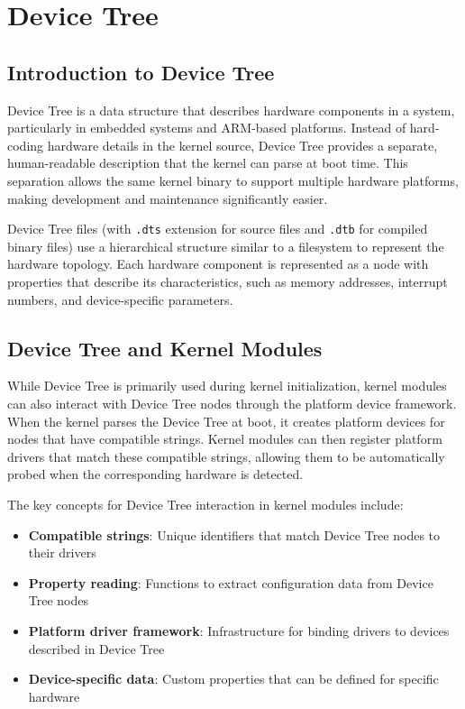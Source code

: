 \documentclass[10pt, oneside]{book}
\begin{document}
\section{Device Tree}
\label{sec:device_tree}
\subsection{Introduction to Device Tree}
\label{sec:dt_intro}
Device Tree is a data structure that describes hardware components in a system, particularly in embedded systems and ARM-based platforms.
Instead of hard-coding hardware details in the kernel source, Device Tree provides a separate, human-readable description that the kernel can parse at boot time.
This separation allows the same kernel binary to support multiple hardware platforms,
making development and maintenance significantly easier.

Device Tree files (with \verb|.dts| extension for source files and \verb|.dtb| for compiled binary files) use a hierarchical structure similar to a filesystem to represent the hardware topology.
Each hardware component is represented as a node with properties that describe its characteristics,
such as memory addresses, interrupt numbers, and device-specific parameters.

\subsection{Device Tree and Kernel Modules}
\label{sec:dt_modules}
While Device Tree is primarily used during kernel initialization, kernel modules can also interact with Device Tree nodes through the platform device framework.
When the kernel parses the Device Tree at boot, it creates platform devices for nodes that have compatible strings.
Kernel modules can then register platform drivers that match these compatible strings, allowing them to be automatically probed when the corresponding hardware is detected.

The key concepts for Device Tree interaction in kernel modules include:
\begin{itemize}
  \item \textbf{Compatible strings}: Unique identifiers that match Device Tree nodes to their drivers
  \item \textbf{Property reading}: Functions to extract configuration data from Device Tree nodes
  \item \textbf{Platform driver framework}: Infrastructure for binding drivers to devices described in Device Tree
  \item \textbf{Device-specific data}: Custom properties that can be defined for specific hardware
\end{itemize}
\end{document}
